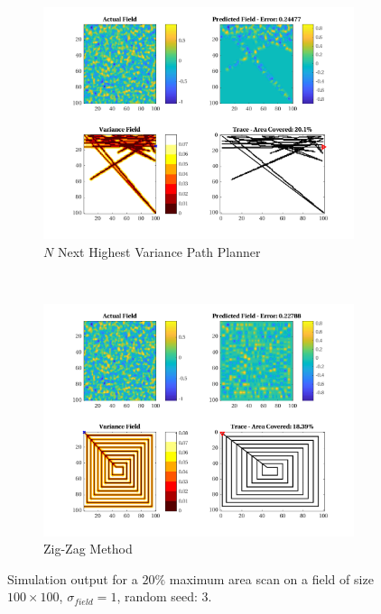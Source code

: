 \begin{figure}[htb!]
\begin{subfigure}[t]{0.5\textwidth}
    \end{subfigure}%
    \\
    \begin{subfigure}[t]{0.5\textwidth}
        \centering
        \includegraphics[width=\linewidth]{figures/hbresults/nnhv_20p_100x100_sf_1_seed_3.png}
        \captionsetup{skip=0.10\baselineskip,size=footnotesize}
        \caption{$N$ Next Highest Variance Path Planner}
    \end{subfigure}%
    ~
    \begin{subfigure}[t]{0.5\textwidth}
        \centering
        \includegraphics[width=\linewidth]{figures/hbresults/zz_20p_100x100_sf_1_seed_3.png}
        \captionsetup{skip=0.10\baselineskip,size=footnotesize}
        \caption{Zig-Zag Method}
    \end{subfigure}%
    \captionsetup{skip=0.20\baselineskip}
    \caption{Simulation output for a $20\%$ maximum area scan on a field of size $100 \times 100$, $\sigma_{field} = 1$, random seed: 3.}
    \label{fig:sim_sigma1_p20_s3}
\end{figure}

